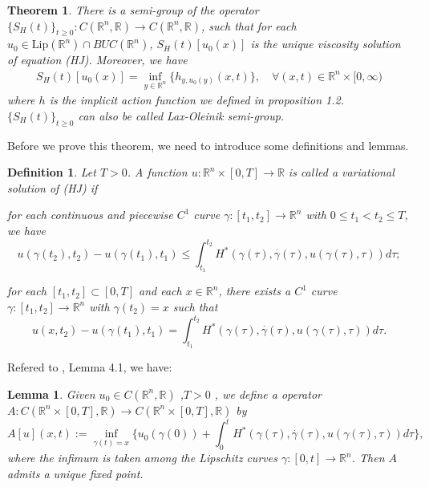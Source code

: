 \documentclass[preprint]{elsarticle}
\newtheorem{result}{\textbf{Theorem}}
\newtheorem{lemma}{Lemma}[section]
\newtheorem{definition}{Definition}[section]
\numberwithin{equation}{section}
\begin{document}
\begin{result}\label{thm1}
    There is a semi-group of the operator $\{S_H(t)\}_{t \geq 0}: C(\mathbb R^n,\mathbb R) \rightarrow C(\mathbb R^n,\mathbb R)$, such that for each $u_0 \in  \text{Lip}(\mathbb R^n)\cap BUC(\mathbb R^n)$, $S_H(t)[u_0(x)]$ is the unique viscosity solution of equation (HJ). Moreover, we have 
        \begin{align}
            S_H(t)[u_0(x)]= \underset{y \in \mathbb R^n}{\inf}\{h_{y,u_0(y)}(x,t)\}, \quad\forall(x,t) \in \mathbb R^n \times [0,\infty)
        \end{align}
    where $h$ is the implicit action function we defined in proposition 1.2. $\{S_H(t)\}_{t \geq 0}$ can also be called Lax-Oleinik semi-group.
\end{result}
Before we prove this theorem, we need to introduce some definitions and lemmas.
\begin{definition}
    Let $T>0$. A function $u:\mathbb R^n \times [0,T] \to \mathbb R$ is called a variational solution of (HJ) if
    \item[(i)] for each continuous and piecewise $C^1$ curve $\gamma : [t_1,t_2]\to \mathbb R^n$ with $0\leq t_1< t_2\leq T$, we have
    \begin{equation}
        u(\gamma(t_2),t_2)-u(\gamma(t_1),t_1)\leq \int _{t_1}^{t_2}H^*(\gamma(\tau),\overset{\cdot}{\gamma}(\tau),u(\gamma(\tau),\tau))d\tau;
    \end{equation}
    \item[(ii)] for each $[t_1,t_2]\subset[0,T]$ and each $x\in \mathbb R^n$, there exists a $C^1$ curve $\gamma: [t_1,t_2]\to \mathbb R^n$ with $\gamma(t_2)=x$ such that
    \begin{equation}
        u(x,t_2)-u(\gamma(t_1),t_1)=\int _{t_1}^{t_2}H^*(\gamma(\tau),\overset{\cdot}{\gamma}(\tau),u(\gamma(\tau),\tau))d\tau.
    \end{equation}
\end{definition}
Refered to \cite{KLJ}, Lemma 4.1, we have:
\begin{lemma}
     Given $u_0 \in C(\mathbb R^n,\mathbb R)$ ,$T>0$ , we define a operator $A:C(\mathbb R^n \times [0,T] ,\mathbb R)\to C(\mathbb R^n \times [0,T] ,\mathbb R)$ by
     \begin{equation}
         A[u](x,t):=\underset{\gamma (t)=x}{\inf}\{u_0(\gamma(0)) +  \int ^t _0 H^*(\gamma (\tau), \overset{\cdot}{\gamma }(\tau),u(\gamma (\tau),\tau)) d\tau\},
     \end{equation}
     where the infimum is taken among the Lipschitz curves $\gamma :[0,t] \to \mathbb R^n$. Then $A$ admits a unique fixed point.\label{fix}
\end{lemma}
\end{document}
